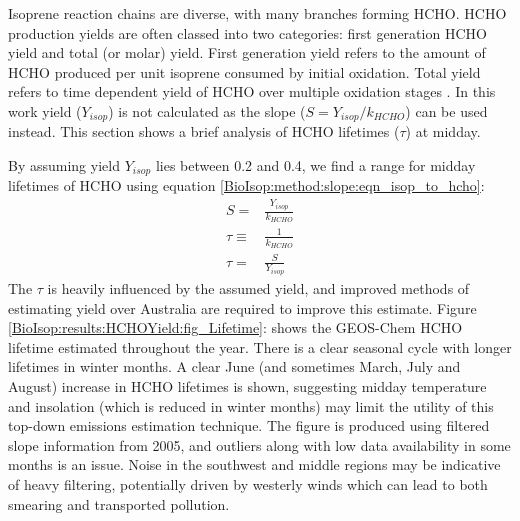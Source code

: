     Isoprene reaction chains are diverse, with many branches forming HCHO.
    HCHO production yields are often classed into two categories: first generation HCHO yield and total (or molar) yield.
    First generation yield refers to the amount of HCHO produced per unit isoprene consumed by initial oxidation.
    Total yield refers to time dependent yield of HCHO over multiple oxidation stages \parencite{Wolfe2016}.
    In this work yield ($Y_{isop}$) is not calculated as the slope ($S = Y_{isop}/k_{HCHO}$) can be used instead.
    This section shows a brief analysis of HCHO lifetimes ($\tau$) at midday.
    
    By assuming yield $Y_{isop}$ lies between 0.2 and 0.4, we find a range for midday lifetimes of HCHO using equation \ref{BioIsop:method:slope:eqn_isop_to_hcho}:
    \begin{eqnarray*}
      S = & \frac{Y_{isop}}{k_{HCHO}} \\
      \tau \equiv & \frac{1}{k_{HCHO}} \\
      \tau = & \frac{S}{Y_{isop}}
    \end{eqnarray*}
    The $\tau$ is heavily influenced by the assumed yield, and improved methods of estimating yield over Australia are required to improve this estimate.
    Figure \ref{BioIsop:results:HCHOYield:fig_Lifetime}: shows the GEOS-Chem HCHO lifetime estimated throughout the year.
    There is a clear seasonal cycle with longer lifetimes in winter months.
    A clear June (and sometimes March, July and August) increase in HCHO lifetimes is shown, suggesting midday temperature and insolation (which is reduced in winter months) may limit the utility of this top-down emissions estimation technique.
    The figure is produced using filtered slope information from 2005, and outliers along with low data availability in some months is an issue.
    Noise in the southwest and middle regions may be indicative of heavy filtering, potentially driven by westerly winds which can lead to both smearing and transported pollution.
    
    
